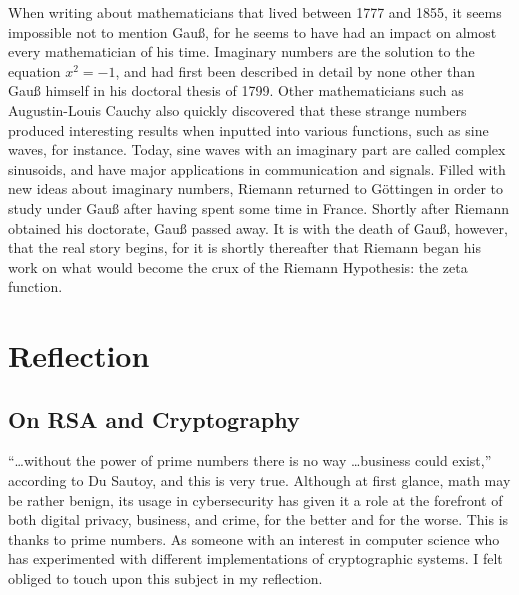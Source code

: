 \documentclass{mathbook}
\begin{document}
    When writing about mathematicians that lived between 1777 and 1855, it seems impossible not to mention Gauß, for he seems to have had an impact on almost every mathematician of his time. Imaginary numbers are the solution to the equation \(x^2 = -1\), and had first been described in detail by none other than Gauß himself in his doctoral thesis of 1799. \cite[p.~69]{Sautoy2003} Other mathematicians such as Augustin-Louis Cauchy also quickly discovered that these strange numbers produced interesting results when inputted into various functions, such as sine waves, for instance. Today, sine waves with an imaginary part are called complex sinusoids, and have major applications in communication and signals. \cite{Veen2014} Filled with new ideas about imaginary numbers, Riemann returned to Göttingen in order to study under Gauß after having spent some time in France. \cite[p.~74]{Sautoy2003} Shortly after Riemann obtained his doctorate, Gauß passed away. It is with the death of Gauß, however, that the real story begins, for it is shortly thereafter that Riemann began his work on what would become the crux of the Riemann Hypothesis: the zeta function.

    \section{Reflection}

    \subsection{On RSA and Cryptography}

    ``\dots without the power of prime numbers there is no way \dots business could exist,'' according to Du Sautoy, \cite[p.~11]{Sautoy2003} and this is very true. Although at first glance, math may be rather benign, its usage in cybersecurity has given it a role at the forefront of both digital privacy, business, and crime, for the better and for the worse. This is thanks to prime numbers. As someone with an interest in computer science who has experimented with different implementations of cryptographic systems. I felt obliged to touch upon this subject in my reflection.\par
    
\end{document}
